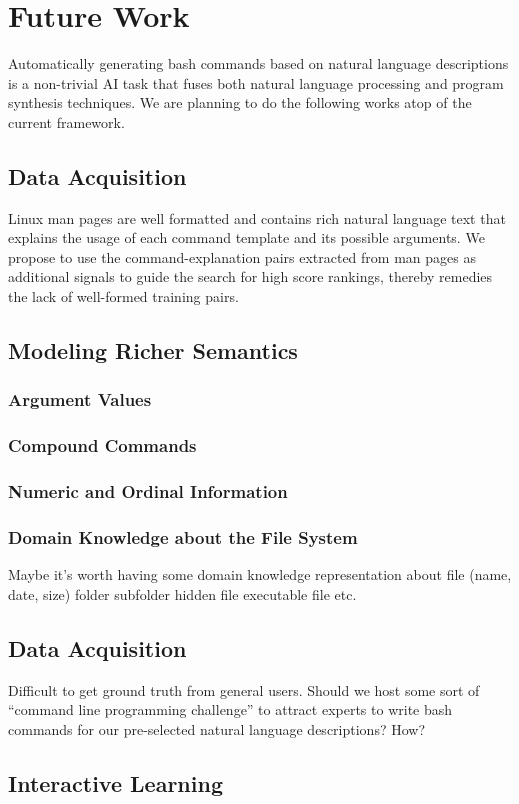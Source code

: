 \section{Future Work}

Automatically generating bash commands based on natural language descriptions is a non-trivial AI task that fuses both natural language processing and program synthesis techniques. We are planning to do the following works atop of the current framework.

\subsection{Data Acquisition}

Linux man pages are well formatted and contains rich natural language text that explains the usage of each command template and its possible arguments. We propose to use the command-explanation pairs extracted from man pages as additional signals to guide the search for high score rankings, thereby remedies the lack of well-formed training pairs.

\subsection{Modeling Richer Semantics}
\label{future:semantics}
\subsubsection{Argument Values}

\subsubsection{Compound Commands}

\subsubsection{Numeric and Ordinal Information}

\subsubsection{Domain Knowledge about the File System}

Maybe it's worth having some domain knowledge representation about 
file (name, date, size)
folder
subfolder
hidden file 
executable file
etc.

\subsection{Data Acquisition}

Difficult to get ground truth from general users. Should we host some sort of ``command line programming challenge'' to attract experts to write bash commands for our pre-selected natural language descriptions? How?

\subsection{Interactive Learning}